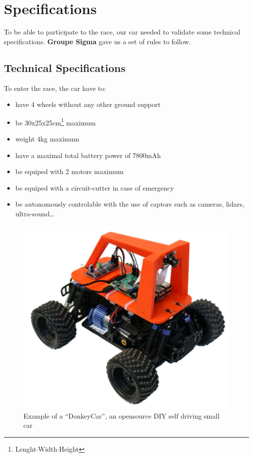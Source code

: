 \section{Specifications}

To be able to participate to the race, our car needed to validate some technical specifications. \textbf{Groupe Sigma} gave us a set of rules to follow.

\subsection{Technical Specifications}
To enter the race, the car have to:
\begin{itemize}
\item have 4 wheels without any other ground support
\item be 30x25x25cm\footnote{Lenght$\cdot$Width$\cdot$Height} maximum
\item weight 4kg maximum
\item have a maximal total battery power of 7800mAh 
\item be equiped with 2 motors maximum
\item be equiped with a circuit-cutter in case of emergency
\item be autonomously controlable with the use of captors such as cameras, lidars, ultra-sound\dots
\end{itemize}

\begin{figure}[!h]
\centering
\includegraphics[scale=0.2]{img/donkey.jpg}
\caption{Example of a ``DonkeyCar'', an opensource DIY self driving small car}
\end{figure}

